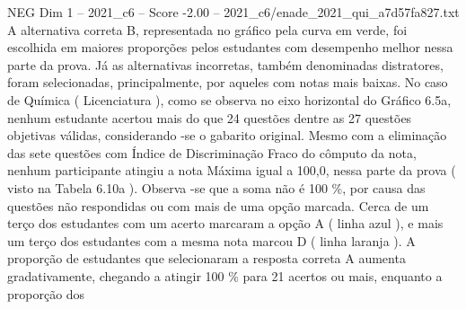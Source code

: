 \begin{textsample}{NEG Dim 1 – 2021\_c6 – Score -2.00 – 2021\_c6/enade\_2021\_qui\_a7d57fa827.txt}
A alternativa correta B, representada no gráfico pela curva em verde, foi escolhida em maiores proporções pelos estudantes com desempenho melhor nessa parte da prova.
Já as alternativas incorretas, também denominadas distratores, foram selecionadas, principalmente, por aqueles com notas mais baixas.
No caso de Química ( Licenciatura ), como se observa no eixo horizontal do Gráfico 6.5a, nenhum estudante acertou mais do que 24 questões dentre as 27 questões objetivas válidas, considerando -se o gabarito original.
Mesmo com a eliminação das sete questões com Índice de Discriminação Fraco do cômputo da nota, nenhum participante atingiu a nota Máxima igual a 100,0, nessa parte da prova ( visto na Tabela 6.10a ).
Observa -se que a soma não é 100 \%, por causa das questões não respondidas ou com mais de uma opção marcada.
Cerca de um terço dos estudantes com um acerto marcaram a opção A ( linha azul ), e mais um terço dos estudantes com a mesma nota marcou D ( linha laranja ).
A proporção de estudantes que selecionaram a resposta correta A aumenta gradativamente, chegando a atingir 100 \% para 21 acertos ou mais, enquanto a proporção dos

\end{textsample}
